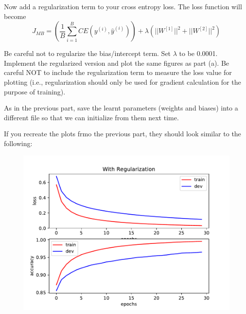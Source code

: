 \item {} Now add a regularization term to your cross entropy loss.
The loss function will become \begin{equation*}
  J_{MB} = \left(\frac{1}{B}\sum_{i=1}^{B}CE(y^{(i)}, \hat{y}^{(i)})\right) + \lambda \left(||W^{[1]}||^2 + ||W^{[2]}||^2 \right)
  \end{equation*}

Be careful not to regularize the bias/intercept term.
Set $\lambda$ to be 0.0001. Implement the regularized version and plot the same
figures as part (a). Be careful NOT to include the regularization term to measure
the loss value for plotting (i.e., regularization should only be used for gradient calculation for
the purpose of training).

As in the previous part, save the learnt parameters (weights and biases) into a
different file so that we can initialize from them next time.

\clearpage\newpage
If you recreate the plots frmo the previous part, they should look similar to the following:

\begin{figure}[H]
    \centering
    \includegraphics[scale=0.75]{mnist/src/regularized.pdf}
\end{figure}